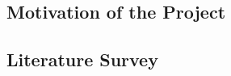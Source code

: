 \documentclass[11pt,fleqn]{book} %
\begin{document}
    
    
    
    
%    
%    

\section{Motivation of the Project}

\section{Literature Survey}

\chapterimage{}
\chapter{}

\section{}

\chapterimage{}
\end{document}
